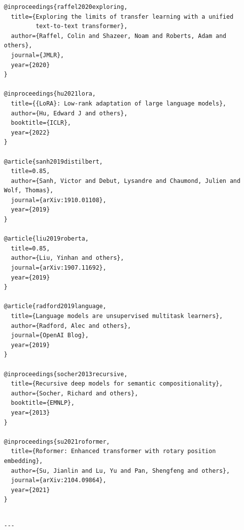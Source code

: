 \begin{lstlisting}
@inproceedings{raffel2020exploring,
  title={Exploring the limits of transfer learning with a unified 
         text-to-text transformer},
  author={Raffel, Colin and Shazeer, Noam and Roberts, Adam and others},
  journal={JMLR},
  year={2020}
}

@inproceedings{hu2021lora,
  title={{LoRA}: Low-rank adaptation of large language models},
  author={Hu, Edward J and others},
  booktitle={ICLR},
  year={2022}
}

@article{sanh2019distilbert,
  title=0.85,
  author={Sanh, Victor and Debut, Lysandre and Chaumond, Julien and Wolf, Thomas},
  journal={arXiv:1910.01108},
  year={2019}
}

@article{liu2019roberta,
  title=0.85,
  author={Liu, Yinhan and others},
  journal={arXiv:1907.11692},
  year={2019}
}

@article{radford2019language,
  title={Language models are unsupervised multitask learners},
  author={Radford, Alec and others},
  journal={OpenAI Blog},
  year={2019}
}

@inproceedings{socher2013recursive,
  title={Recursive deep models for semantic compositionality},
  author={Socher, Richard and others},
  booktitle={EMNLP},
  year={2013}
}

@inproceedings{su2021roformer,
  title={Roformer: Enhanced transformer with rotary position embedding},
  author={Su, Jianlin and Lu, Yu and Pan, Shengfeng and others},
  journal={arXiv:2104.09864},
  year={2021}
}
\end{lstlisting}
\begin{lstlisting}

---
\end{lstlisting}